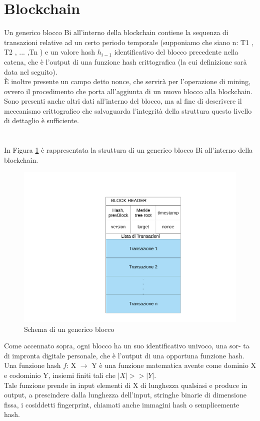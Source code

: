 \section{Blockchain}
Un generico blocco Bi all’interno della blockchain contiene la sequenza di transazioni relative ad un certo periodo temporale (supponiamo che siano n: T1 , T2 , ... ,Tn ) e un valore hash $h_{i-1}$ identificativo del blocco precedente nella catena, che è l’output di una funzione hash crittografica (la cui definizione sarà data nel seguito).\\È inoltre presente un campo detto nonce, che servirà per l’operazione di mining, ovvero il procedimento che porta all’aggiunta di un nuovo blocco alla blockchain. Sono presenti anche altri dati all’interno del blocco, ma al fine di descrivere il meccanismo crittografico che salvaguarda l’integrità della struttura questo livello di dettaglio è sufficiente.\\\\\\In Figura \ref{fig:blocchi} è rappresentata la struttura di un generico blocco Bi all’interno della blockchain.
\begin{figure}[h!]
    \centering
    \includegraphics[scale=0.4, trim = 0cm 0cm 0cm 3cm, clip]{Images/blocco_singolo.pdf}
    \caption{Schema di un generico blocco}
    \label{fig:blocchi}
\end{figure}
\FloatBarrier
Come accennato sopra, ogni blocco ha un suo identificativo univoco, una sor-
ta di impronta digitale personale, che è l’output di una opportuna funzione
hash.\\
Una funzione hash $f$: X $\longrightarrow$ Y è una funzione matematica avente come dominio X e codominio Y, insiemi finiti tali che $|X| >> |Y |$.\\Tale funzione prende in input elementi di X di lunghezza qualsiasi e produce in output, a prescindere dalla lunghezza dell’input, stringhe binarie di dimensione fissa, i cosiddetti fingerprint, chiamati anche immagini hash o semplicemente hash.\\
